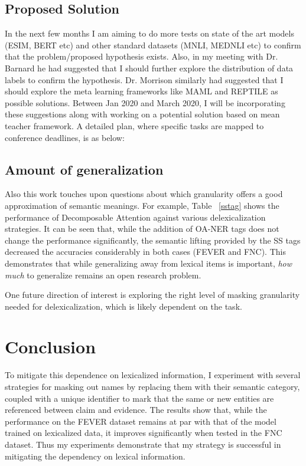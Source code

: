 \documentclass[compsoc,onecolumn]{IEEEtran}
\begin{document}
\subsection{Proposed Solution}


In the next few months I am aiming to do more tests on state of the art models (ESIM, BERT etc) and other standard datasets (MNLI, MEDNLI etc)  to confirm that the problem/proposed hypothesis exists. Also, in my meeting with Dr. Barnard he had suggested that I should further explore the distribution of data labels to confirm the hypothesis. Dr. Morrison similarly had suggested that I should explore the meta learning frameworks like MAML and REPTILE as possible solutions. Between Jan 2020 and March 2020, I will be incorporating these suggestions along with working on a potential solution based on mean teacher framework. A detailed plan, where specific tasks are mapped to conference deadlines, is as below:

\subsection{Amount of generalization}
Also this work touches upon questions about which granularity offers a good approximation of semantic meanings. For example, Table ~\ref{sstag} shows the performance of Decomposable Attention against various delexicalization strategies. It can be seen that, while the addition of OA-NER tags does not change the performance significantly, the semantic lifting provided by the SS tags decreased the accuracies considerably in both cases (FEVER and FNC).  This demonstrates that while generalizing away from lexical items is important, {\em how much} to generalize remains an open research problem.

One future direction of interest is exploring the right level of masking granularity needed for delexicalization, which is likely dependent on the task. 

\section{Conclusion}
 To mitigate this dependence on lexicalized information, I experiment with several strategies for masking out names by replacing them with their semantic category, coupled with a unique identifier to mark that the same or new entities are referenced between claim and evidence. The results show that, while the performance on the FEVER dataset remains at par with that of the model trained on lexicalized data, it improves significantly when tested in the FNC dataset. Thus my experiments demonstrate that my strategy is successful in mitigating the dependency on lexical information.
\end{document}
